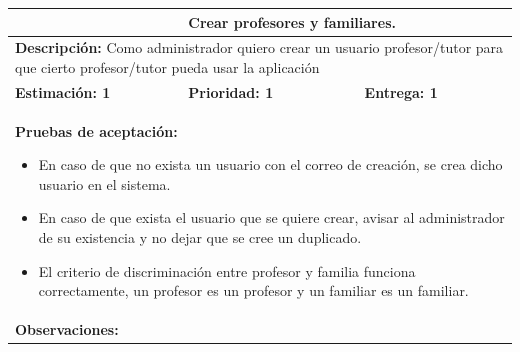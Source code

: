 \begin{table}[H]
\centering
{}
\begin{tabularx}{\textwidth}{|X|X|X|}
\hline
\rowcolor{azulclaro}
\multicolumn{1}{|l|}{\textbf{Identificador:} HU-A2} & \multicolumn{2}{l|}{\textbf{Crear profesores y familiares.}} \\ \hline
\multicolumn{3}{|p{\dimexpr\textwidth-2\tabcolsep-2\arrayrulewidth}|}{\textbf{Descripción:} Como administrador quiero crear un usuario profesor/tutor para que cierto profesor/tutor pueda usar la aplicación} \\ \hline
\rowcolor{white}
\textbf{Estimación: 1} & \textbf{Prioridad: 1} & \textbf{Entrega: 1} \\ \hline
\multicolumn{3}{|p{\dimexpr\textwidth-2\tabcolsep-2\arrayrulewidth}|}{%
\textbf{Pruebas de aceptación:}
\begin{itemize}[leftmargin=1.5em, itemsep=2pt, topsep=3pt]
    \item En caso de que no exista un usuario con el correo de creación, se crea dicho usuario en el sistema.
    \item En caso de que exista el usuario que se quiere crear, avisar al administrador de su existencia y no dejar que se cree un duplicado.
    \item El criterio de discriminación entre profesor y familia funciona correctamente, un profesor es un profesor y un familiar es un familiar.
\end{itemize}
} \\ \hline
\multicolumn{3}{|p{\dimexpr\textwidth-2\tabcolsep-2\arrayrulewidth}|}{\textbf{Observaciones:}} \\ \hline
\end{tabularx}
\end{table}

\vspace{0.4cm}

